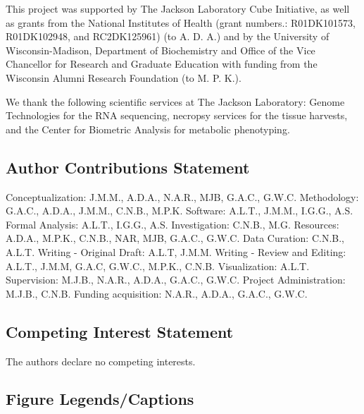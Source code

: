 \documentclass[
]{article}
\begin{document}
This project was supported by The Jackson Laboratory Cube Initiative, as
well as grants from the National Institutes of Health (grant numbers.:
R01DK101573, R01DK102948, and RC2DK125961) (to A. D. A.) and by the
University of Wisconsin-Madison, Department of Biochemistry and Office
of the Vice Chancellor for Research and Graduate Education with funding
from the Wisconsin Alumni Research Foundation (to M. P. K.).

We thank the following scientific services at The Jackson Laboratory:
Genome Technologies for the RNA sequencing, necropsy services for the
tissue harvests, and the Center for Biometric Analysis for metabolic
phenotyping.

\subsection{Author Contributions
Statement}\label{author-contributions-statement}

Conceptualization: J.M.M., A.D.A., N.A.R., MJB, G.A.C., G.W.C.
Methodology: G.A.C., A.D.A., J.M.M., C.N.B., M.P.K. Software: A.L.T.,
J.M.M., I.G.G., A.S. Formal Analysis: A.L.T., I.G.G., A.S.
Investigation: C.N.B., M.G. Resources: A.D.A., M.P.K., C.N.B., NAR, MJB,
G.A.C., G.W.C. Data Curation: C.N.B., A.L.T. Writing - Original Draft:
A.L.T, J.M.M. Writing - Review and Editing: A.L.T., J.M.M, G.A.C,
G.W.C., M.P.K., C.N.B. Visualization: A.L.T. Supervision: M.J.B.,
N.A.R., A.D.A., G.A.C., G.W.C. Project Administration: M.J.B., C.N.B.
Funding acquisition: N.A.R., A.D.A., G.A.C., G.W.C.

\subsection{Competing Interest
Statement}\label{competing-interest-statement}

The authors declare no competing interests.

\subsection{Figure Legends/Captions}\label{figure-legendscaptions}
\end{document}

